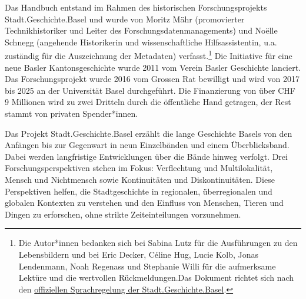 \documentclass[
  letterpaper,
  DIV=11,
  numbers=noendperiod]{scrartcl}
\begin{document}
Das Handbuch entstand im Rahmen des historischen Forschungsprojekts
Stadt.Geschichte.Basel und wurde von Moritz Mähr (promovierter
Technikhistoriker und Leiter des Forschungsdatenmanagements) und Noëlle
Schnegg (angehende Historikerin und wissenschaftliche Hilfsassistentin,
u.a. zuständig für die Auszeichnung der Metadaten) verfasst.\footnote{Die
  Autor*innen bedanken sich bei Sabina Lutz für die Ausführungen zu den
  Lebensbildern und bei Eric Decker, Céline Hug, Lucie Kolb, Jonas
  Lendenmann, Noah Regenass und Stephanie Willi für die aufmerksame
  Lektüre und die wertvollen Rückmeldungen.Das Dokument richtet sich
  nach den
  \href{https://stadtgeschichtebasel.ch/sprachregelung-der-stadt-geschichte-basel}{offiziellen
  Sprachregelung der Stadt.Geschichte.Basel}.} Die Initiative für eine
neue Basler Kantonsgeschichte wurde 2011 vom Verein Basler Geschichte
lanciert. Das Forschungsprojekt wurde 2016 vom Grossen Rat bewilligt und
wird von 2017 bis 2025 an der Universität Basel durchgeführt. Die
Finanzierung von über CHF 9 Millionen wird zu zwei Dritteln durch die
öffentliche Hand getragen, der Rest stammt von privaten Spender*innen.

Das Projekt Stadt.Geschichte.Basel erzählt die lange Geschichte Basels
von den Anfängen bis zur Gegenwart in neun Einzelbänden und einem
Überblicksband. Dabei werden langfristige Entwicklungen über die Bände
hinweg verfolgt. Drei Forschungsperspektiven stehen im Fokus:
Verflechtung und Multilokalität, Mensch und Nichtmensch sowie
Kontinuitäten und Diskontinuitäten. Diese Perspektiven helfen, die
Stadtgeschichte in regionalen, überregionalen und globalen Kontexten zu
verstehen und den Einfluss von Menschen, Tieren und Dingen zu
erforschen, ohne strikte Zeiteinteilungen vorzunehmen.
\end{document}
